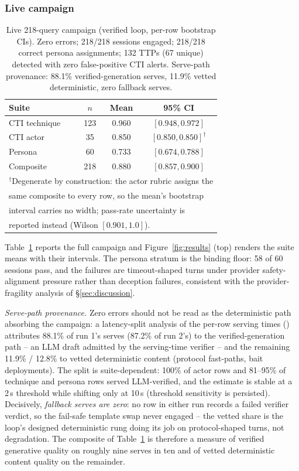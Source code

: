 \subsubsection{Live campaign}
\begin{table}[t]
\centering
\caption{Live 218-query campaign (verified loop, per-row bootstrap CIs).
Zero errors; 218/218 sessions engaged; 218/218 correct persona
assignments; 132 TTPs (67 unique) detected with zero false-positive CTI
alerts. Serve-path provenance: 88.1\% verified-generation serves,
11.9\% vetted deterministic, zero fallback serves.}
\label{tab:live}
\begin{tabular}{lccc}
\toprule
Suite & $n$ & Mean & 95\% CI \\
\midrule
CTI technique & 123 & 0.960 & $[0.948, 0.972]$ \\
CTI actor     & 35  & 0.850 & $[0.850, 0.850]^\dagger$ \\
Persona       & 60  & 0.733 & $[0.674, 0.788]$ \\
\midrule
Composite     & 218 & 0.880 & $[0.857, 0.900]$ \\
\bottomrule
\multicolumn{4}{l}{\footnotesize $^\dagger$Degenerate by construction: the actor rubric assigns the} \\
\multicolumn{4}{l}{\footnotesize same composite to every row, so the mean's bootstrap} \\
\multicolumn{4}{l}{\footnotesize interval carries no width; pass-rate uncertainty is} \\
\multicolumn{4}{l}{\footnotesize reported instead (Wilson $[0.901, 1.0]$).} \\
\end{tabular}
\end{table}
Table~\ref{tab:live} reports the full campaign and
Figure~\ref{fig:results} (top) renders the suite means with their
intervals. The persona stratum is
the binding floor: 58 of 60 sessions pass, and the failures are
timeout-shaped turns under provider safety-alignment pressure rather
than deception failures, consistent with the provider-fragility
analysis of \S\ref{sec:discussion}.

\emph{Serve-path provenance.} Zero errors should not be read as the
deterministic path absorbing the campaign: a latency-split analysis of
the per-row serving times () attributes
88.1\% of run 1's serves (87.2\% of run 2's) to the verified-generation
path -- an LLM draft admitted by the serving-time verifier -- and the
remaining 11.9\% / 12.8\% to vetted deterministic content (protocol
fast-paths, bait deployments). The split is suite-dependent: 100\% of
actor rows and 81--95\% of technique and persona rows served
LLM-verified, and the estimate is stable at a 2\,s threshold while
shifting only at 10\,s (threshold sensitivity is persisted). Decisively,
\emph{fallback serves are zero}: no row in either run records a failed
verifier verdict, so the fail-safe template swap never engaged -- the
vetted share is the loop's designed deterministic rung doing its job on
protocol-shaped turns, not degradation. The composite of Table~\ref{tab:live}
is therefore a measure of verified generative quality on roughly nine
serves in ten and of vetted deterministic content quality on the
remainder.

